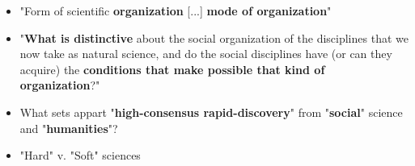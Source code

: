
\begin{itemize}

	\item "Form of scientific \textbf{organization} [...] \textbf{mode of organization}" \citep[158-160]{collins1994}

	\item "\textbf{What is distinctive} about the social organization of the disciplines that we now take as natural science, and do the social disciplines have (or can they acquire) the \textbf{conditions that make possible that kind of organization}?" \citep[156]{collins1994}

	\item What sets appart "\textbf{high-consensus rapid-discovery}" from "\textbf{social}" science and "\textbf{humanities}"? \citep[158]{collins1994}

	\item "Hard" v. "Soft" sciences

\end{itemize}



















	

	
		
		
		




